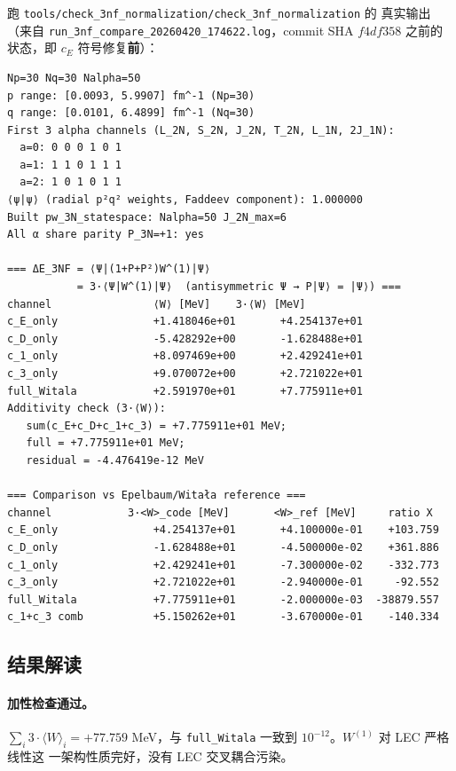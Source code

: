 \begin{numericalbox}[label={box:ch17-real-output}]
跑 \texttt{tools/check\_3nf\_normalization/check\_3nf\_normalization} 的
真实输出（来自 \texttt{run\_3nf\_compare\_20260420\_174622.log}，commit
SHA \(f4df358\) 之前的状态，即 \(c_E\) 符号修复\textbf{前}）：

\begin{verbatim}
Np=30 Nq=30 Nalpha=50
p range: [0.0093, 5.9907] fm^-1 (Np=30)
q range: [0.0101, 6.4899] fm^-1 (Nq=30)
First 3 alpha channels (L_2N, S_2N, J_2N, T_2N, L_1N, 2J_1N):
  a=0: 0 0 0 1 0 1
  a=1: 1 1 0 1 1 1
  a=2: 1 0 1 0 1 1
⟨ψ|ψ⟩ (radial p²q² weights, Faddeev component): 1.000000
Built pw_3N_statespace: Nalpha=50 J_2N_max=6
All α share parity P_3N=+1: yes

=== ΔE_3NF = ⟨Ψ|(1+P+P²)W^(1)|Ψ⟩
           = 3·⟨Ψ|W^(1)|Ψ⟩  (antisymmetric Ψ → P|Ψ⟩ = |Ψ⟩) ===
channel                ⟨W⟩ [MeV]    3·⟨W⟩ [MeV]
c_E_only               +1.418046e+01       +4.254137e+01
c_D_only               -5.428292e+00       -1.628488e+01
c_1_only               +8.097469e+00       +2.429241e+01
c_3_only               +9.070072e+00       +2.721022e+01
full_Witala            +2.591970e+01       +7.775911e+01
Additivity check (3·⟨W⟩):
   sum(c_E+c_D+c_1+c_3) = +7.775911e+01 MeV;
   full = +7.775911e+01 MeV;
   residual = -4.476419e-12 MeV

=== Comparison vs Epelbaum/Witała reference ===
channel            3·<W>_code [MeV]       <W>_ref [MeV]     ratio X
c_E_only               +4.254137e+01       +4.100000e-01    +103.759
c_D_only               -1.628488e+01       -4.500000e-02    +361.886
c_1_only               +2.429241e+01       -7.300000e-02    -332.773
c_3_only               +2.721022e+01       -2.940000e-01     -92.552
full_Witala            +7.775911e+01       -2.000000e-03  -38879.557
c_1+c_3 comb           +5.150262e+01       -3.670000e-01    -140.334
\end{verbatim}
\end{numericalbox}

\subsection{结果解读}
\label{subsec:ch17-results-analysis}

\paragraph{加性检查通过。}
\(\sum_i 3\cdot\langle W\rangle_i = +77.759\) MeV，与
\texttt{full\_Witala} 一致到 \(10^{-12}\)。\(W^{(1)}\) 对 LEC 严格线性这
一架构性质完好，没有 LEC 交叉耦合污染。

